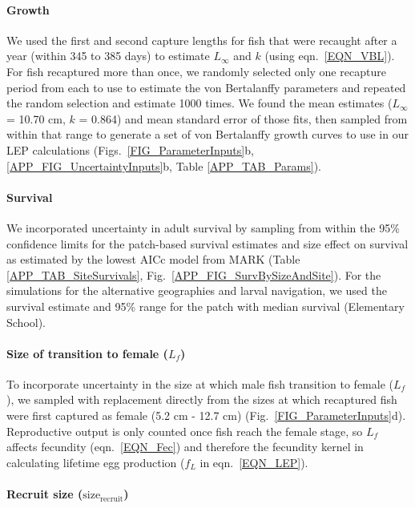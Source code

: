 \documentclass[12pt, oneside]{article}   	%
\begin{document}
\paragraph*{Growth} %

We used the first and second capture lengths for fish that were recaught after a year (within 345 to 385 days) to estimate $L_\infty$ and $k$ (using eqn.\ \ref{EQN_VBL}). For fish recaptured more than once, we randomly selected only one recapture period from each to use to estimate the von Bertalanffy parameters and repeated the random selection and estimate 1000 times. We found the mean estimates ($L_\infty$ = 10.70 cm, $k$ = 0.864) and mean standard error of those fits, then sampled from within that range to generate a set of von Bertalanffy growth curves to use in our LEP calculations (Figs.\ \ref{FIG_ParameterInputs}b, \ref{APP_FIG_UncertaintyInputs}b,  Table \ref{APP_TAB_Params}).

\paragraph*{Survival} %

We incorporated uncertainty in adult survival by sampling from within the 95\% confidence limits for the patch-based survival estimates and size effect on survival as estimated by the lowest AICc model from MARK (Table \ref{APP_TAB_SiteSurvivals}, Fig.\ \ref{APP_FIG_SurvBySizeAndSite}). For the simulations for the alternative geographies and larval navigation, we used the survival estimate and 95\% range for the patch with median survival (Elementary School).

\paragraph*{Size of transition to female ($L_f$)} %

To incorporate uncertainty in the size at which male fish transition to female ($L_f$), we sampled with replacement directly from the sizes at which recaptured fish were first captured as female (5.2 cm - 12.7 cm) (Fig.\ \ref{FIG_ParameterInputs}d). Reproductive output is only counted once fish reach the female stage, so $L_f$ affects fecundity (eqn.\ \ref{EQN_Fec}) and therefore the fecundity kernel in calculating lifetime egg production ($f_L$ in eqn.\ \ref{EQN_LEP}).

\paragraph*{Recruit size ($\text{size}_\text{recruit}$)} %
\end{document}
